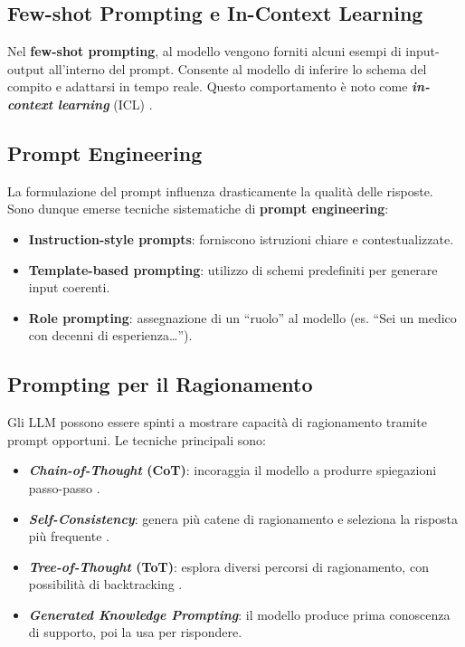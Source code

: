 \subsection{Few-shot Prompting e In-Context Learning}
Nel \textbf{few-shot prompting}, al modello vengono forniti alcuni esempi 
di input-output all'interno del prompt. Consente al modello di inferire lo schema del compito e adattarsi in tempo reale.
Questo comportamento è noto come \textbf{\textit{in-context learning}} (ICL) \cite{dong2023survey}.

\subsection{Prompt Engineering}
La formulazione del prompt influenza drasticamente la qualità delle risposte.
Sono dunque emerse tecniche sistematiche di \textbf{prompt engineering}:
\begin{itemize}
    \item \textbf{Instruction-style prompts}: forniscono istruzioni chiare e contestualizzate.
    \item \textbf{Template-based prompting}: utilizzo di schemi predefiniti per generare input coerenti.
    \item \textbf{Role prompting}: assegnazione di un “ruolo” al modello (es. “Sei un medico con decenni di esperienza…”).
\end{itemize}

\subsection{Prompting per il Ragionamento}
Gli LLM possono essere spinti a mostrare capacità di ragionamento tramite prompt opportuni.
Le tecniche principali sono:
\begin{itemize}
    \item \textbf{\textit{Chain-of-Thought} (CoT)}: incoraggia il modello a produrre spiegazioni passo-passo \cite{wei2022chain}.
    \item \textbf{\textit{Self-Consistency}}: genera più catene di ragionamento e seleziona la risposta più frequente \cite{wang2022selfconsistency}.
    \item \textbf{\textit{Tree-of-Thought} (ToT)}: esplora diversi percorsi di ragionamento, con possibilità di backtracking \cite{yao2023tree}.
    \item \textbf{\textit{Generated Knowledge Prompting}}: il modello produce prima conoscenza di supporto, poi la usa per rispondere.
\end{itemize}

